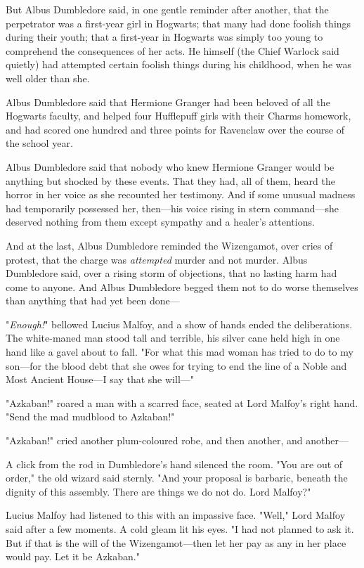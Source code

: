 But Albus Dumbledore said, in one gentle reminder after another, that the
perpetrator was a first-year girl in Hogwarts; that many had done foolish
things during their youth; that a first-year in Hogwarts was simply too young
to comprehend the consequences of her acts. He himself (the Chief Warlock said
quietly) had attempted certain foolish things during his childhood, when he was
well older than she.

Albus Dumbledore said that Hermione Granger had been beloved of all the
Hogwarts faculty, and helped four Hufflepuff girls with their Charms homework,
and had scored one hundred and three points for Ravenclaw over the course of
the school year.

Albus Dumbledore said that nobody who knew Hermione Granger would be anything
but shocked by these events. That they had, all of them, heard the horror in
her voice as she recounted her testimony. And if some unusual madness had
temporarily possessed her, then---his voice rising in stern command---she
deserved nothing from them except sympathy and a healer's attentions.

And at the last, Albus Dumbledore reminded the Wizengamot, over cries of
protest, that the charge was \emph{attempted} murder and not murder. Albus
Dumbledore said, over a rising storm of objections, that no lasting harm had
come to anyone. And Albus Dumbledore begged them not to do worse themselves
than anything that had yet been done---

"\emph{Enough!}" bellowed Lucius Malfoy, and a show of hands ended the
deliberations. The white-maned man stood tall and terrible, his silver cane
held high in one hand like a gavel about to fall. "For what this mad woman has
tried to do to my son---for the blood debt that she owes for trying to end the
line of a Noble and Most Ancient House---I say that she will---"

"Azkaban!" roared a man with a scarred face, seated at Lord Malfoy's right
hand. "Send the mad mudblood to Azkaban!"

"Azkaban!" cried another plum-coloured robe, and then another, and another---

A click from the rod in Dumbledore's hand silenced the room. "You are out of
order," the old wizard said sternly. "And your proposal is barbaric, beneath
the dignity of this assembly. There are things we do not do. Lord Malfoy?"

Lucius Malfoy had listened to this with an impassive face. "Well," Lord Malfoy
said after a few moments. A cold gleam lit his eyes. "I had not planned to ask
it. But if that is the will of the Wizengamot---then let her pay as any in her
place would pay. Let it be Azkaban."

